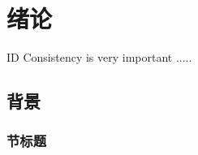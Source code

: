 \cleardoublepage

\section{绪论}
ID Consistency is very important .....
\subsection{背景}

\subsubsection{节标题}
